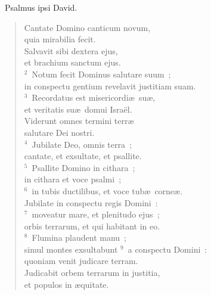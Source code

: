 ~\lettrine[lines=10,image=true,loversize=0.05,lraise=-0.03]{P}{}salmus ipsi David. \begin{flushleft}\begin{verse}\vspace{6pt}Cantate Domino canticum novum,\\ quia mirabilia fecit.\\ Salvavit sibi dextera ejus,\\ et brachium sanctum ejus.\\
${}^{2}$~Notum fecit Dominus salutare suum~;\\ in conspectu gentium revelavit justitiam suam.\\
${}^{3}$~Recordatus est misericordi\ae\ su\ae ,\\ et veritatis su\ae\ domui Isra\"el.\\ Viderunt omnes termini terr\ae \\ salutare Dei nostri.\\
${}^{4}$~Jubilate Deo, omnis terra~;\\ cantate, et exsultate, et psallite.\\
${}^{5}$~Psallite Domino in cithara~;\\ in cithara et voce psalmi~;\\
${}^{6}$~in tubis ductilibus, et voce tub\ae\ corne\ae .\\ Jubilate in conspectu regis Domini~:\\
${}^{7}$~moveatur mare, et plenitudo ejus~;\\ orbis terrarum, et qui habitant in eo.\\
${}^{8}$~Flumina plaudent manu~;\\ simul montes exsultabunt
${}^{9}$~a conspectu Domini~:\\ quoniam venit judicare terram.\\ Judicabit orbem terrarum in justitia,\\ et populos in \ae quitate.\end{verse}\end{flushleft}


